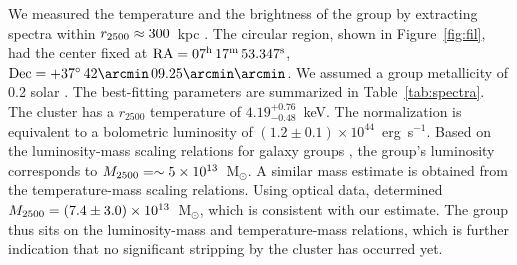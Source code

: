 We measured the temperature and the brightness of the group by extracting spectra within $r_{\rm 2500} \approx 300$~kpc \citep{Medezinski2013}. The circular region, shown in Figure~\ref{fig:fil}, had the center fixed at ${\rm RA} = 07^{\rm h}\, 17^{\rm m}\, 53.347^{\rm s}$, ${\rm Dec} = +37^{\circ}\, 42\arcmin \, 09.25\arcmin\arcmin$. We assumed a group metallicity of 0.2 solar \citep[e.g.,][]{Rasmussen2007}. The best-fitting parameters are summarized in Table~\ref{tab:spectra}. The cluster has a $r_{2500}$ temperature of $4.19_{-0.48}^{+0.76}$~keV. The normalization is equivalent to a bolometric luminosity of $(1.2\pm 0.1) \times 10^{44}$~erg~s$^{-1}$. Based on the luminosity-mass scaling relations for galaxy groups \citep[e.g.,][]{Connor2014}, the group's luminosity corresponds to $M_{\rm 2500} = \sim 5\times 10^{13}$~M$_\odot$. A similar mass estimate is obtained from the temperature-mass scaling relations.  Using optical data, \citet{Medezinski2013} determined $M_{\rm 2500} = (7.4\pm 3.0) \times 10^{13}$~M$_\odot$, which is consistent with our estimate. The group thus sits on the luminosity-mass and temperature-mass relations, which is further indication that no significant stripping by the cluster has occurred yet.

